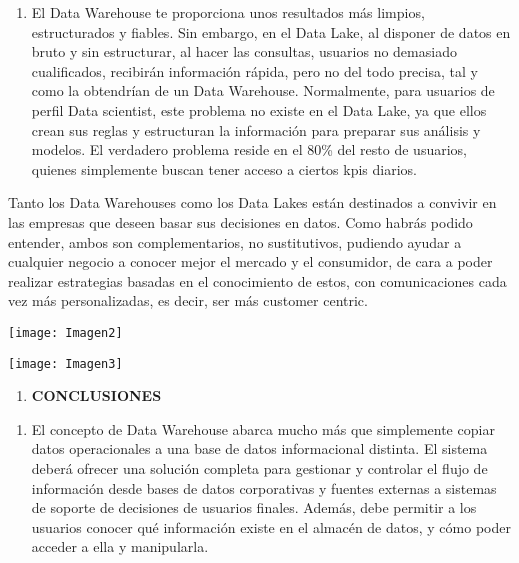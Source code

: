 \documentclass{article} %
\begin{document}
\begin{enumerate}
\item  El Data Warehouse te proporciona unos resultados m\'{a}s limpios, estructurados y fiables. Sin embargo, en el Data Lake, al disponer de datos en bruto y sin estructurar, al hacer las consultas, usuarios no demasiado cualificados, recibir\'{a}n informaci\'{o}n r\'{a}pida, pero no del todo precisa, tal y como la obtendr\'{i}an de un Data Warehouse. Normalmente, para usuarios de perfil Data scientist, este problema no existe en el Data Lake, ya que ellos crean sus reglas y estructuran la informaci\'{o}n para preparar sus an\'{a}lisis y modelos. El verdadero problema reside en el 80\% del resto de usuarios, quienes simplemente buscan tener acceso a ciertos kpis diarios.
\end{enumerate}

\noindent 

\noindent Tanto los Data Warehouses como los Data Lakes est\'{a}n destinados a convivir en las empresas que deseen basar sus decisiones en datos. Como habr\'{a}s podido entender, ambos son complementarios, no sustitutivos, pudiendo ayudar a cualquier negocio a conocer mejor el mercado y el consumidor, de cara a poder realizar estrategias basadas en el conocimiento de estos, con comunicaciones cada vez m\'{a}s personalizadas, es decir, ser m\'{a}s customer centric.

\noindent 

\noindent 

\noindent \texttt{[image: Imagen2]}

\noindent 

\noindent 

\noindent \texttt{[image: Imagen3]}

\begin{enumerate}
\item  \textbf{CONCLUSIONES}
\end{enumerate}

\noindent \textbf{}

\begin{enumerate}
\item \textbf{ }El concepto de Data Warehouse abarca mucho m\'{a}s que simplemente copiar datos operacionales a una base de datos informacional distinta. El sistema deber\'{a} ofrecer una soluci\'{o}n completa para gestionar y controlar el flujo de informaci\'{o}n desde bases de datos corporativas y fuentes externas a sistemas de soporte de decisiones de usuarios finales. Adem\'{a}s, debe permitir a los usuarios conocer qu\'{e} informaci\'{o}n existe en el almac\'{e}n de datos, y c\'{o}mo poder acceder a ella y manipularla.
\end{enumerate}
\end{document}
